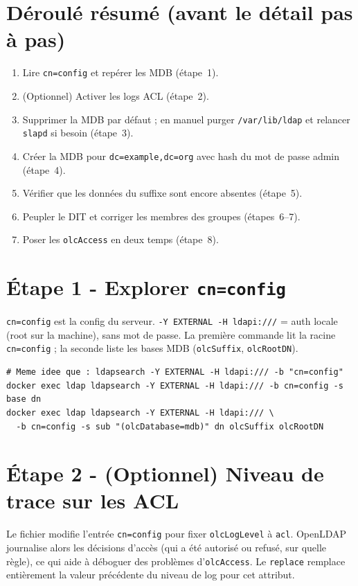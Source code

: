 \documentclass[11pt,a4paper]{report}
\begin{document}
\section{Déroulé résumé (avant le détail pas à pas)}

\begin{enumerate}[leftmargin=*]
  \item Lire \texttt{cn=config} et repérer les MDB (étape~1).
  \item (Optionnel) Activer les logs ACL (étape~2).
  \item Supprimer la MDB par défaut ; en manuel purger \texttt{/var/lib/ldap} et relancer \texttt{slapd} si besoin (étape~3).
  \item Créer la MDB pour \texttt{dc=example,dc=org} avec hash du mot de passe admin (étape~4).
  \item Vérifier que les données du suffixe sont encore absentes (étape~5).
  \item Peupler le DIT et corriger les membres des groupes (étapes~6--7).
  \item Poser les \texttt{olcAccess} en deux temps (étape~8).
\end{enumerate}

\section{Étape 1 - Explorer \texttt{cn=config}}

\texttt{cn=config} est la config du serveur. \texttt{-Y EXTERNAL -H ldapi:///} = auth locale (root sur la machine), sans mot de passe. La première commande lit la racine \texttt{cn=config} ; la seconde liste les bases MDB (\texttt{olcSuffix}, \texttt{olcRootDN}).

\begin{lstlisting}[style=bashstyle]
# Meme idee que : ldapsearch -Y EXTERNAL -H ldapi:/// -b "cn=config"
docker exec ldap ldapsearch -Y EXTERNAL -H ldapi:/// -b cn=config -s base dn
docker exec ldap ldapsearch -Y EXTERNAL -H ldapi:/// \
  -b cn=config -s sub "(olcDatabase=mdb)" dn olcSuffix olcRootDN
\end{lstlisting}

\section{Étape 2 - (Optionnel) Niveau de trace sur les ACL}

Le fichier modifie l'entrée \texttt{cn=config} pour fixer \texttt{olcLogLevel} à \texttt{acl}. OpenLDAP journalise alors les décisions d'accès (qui a été autorisé ou refusé, sur quelle règle), ce qui aide à déboguer des problèmes d'\texttt{olcAccess}. Le \texttt{replace} remplace entièrement la valeur précédente du niveau de log pour cet attribut.
\end{document}
